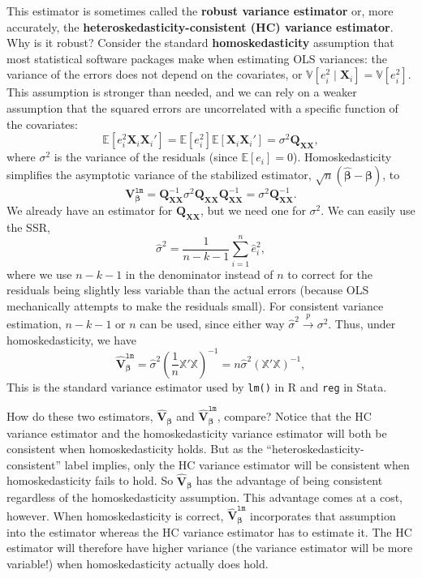 \documentclass[
  13pt,
  letterpaper,
  DIV=11,
  numbers=noendperiod]{scrreprt}
\newcommand{\mb}{\bm}
\newcommand{\E}{\mathbb{E}}
\newcommand{\V}{\mathbb{V}}
\newcommand{\X}{\mb{X}}
\newcommand{\Xmat}{\mathbb{X}}
\newcommand{\bfbeta}{\mb{\beta}}
\newcommand{\bhat}{\widehat{\mb{\beta}}}
\newcommand{\inprob}{\overset{p}{\to}}
\theoremstyle{plain}
\theoremstyle{plain}
\theoremstyle{definition}
\theoremstyle{definition}
\theoremstyle{remark}
\begin{document}
This estimator is sometimes called the \textbf{robust variance
estimator} or, more accurately, the
\textbf{heteroskedasticity-consistent (HC) variance estimator}. Why is
it robust? Consider the standard \textbf{homoskedasticity} assumption
that most statistical software packages make when estimating OLS
variances: the variance of the errors does not depend on the covariates,
or \(\V[e_{i}^{2} \mid \X_{i}] = \V[e_{i}^{2}]\). This assumption is
stronger than needed, and we can rely on a weaker assumption that the
squared errors are uncorrelated with a specific function of the
covariates: \[ 
\E[e_{i}^{2}\X_{i}\X_{i}'] = \E[e_{i}^{2}]\E[\X_{i}\X_{i}'] = \sigma^{2}\mb{Q}_{\X\X}, 
\] where \(\sigma^2\) is the variance of the residuals (since
\(\E[e_{i}] = 0\)). Homoskedasticity simplifies the asymptotic variance
of the stabilized estimator, \(\sqrt{n}(\bhat - \bfbeta)\), to \[ 
\mb{V}^{\texttt{lm}}_{\bfbeta} = \mb{Q}_{\X\X}^{-1}\sigma^{2}\mb{Q}_{\X\X}\mb{Q}_{\X\X}^{-1} = \sigma^2\mb{Q}_{\X\X}^{-1}.
\] We already have an estimator for \(\mb{Q}_{\X\X}\), but we need one
for \(\sigma^2\). We can easily use the SSR, \[ 
\widehat{\sigma}^{2} = \frac{1}{n-k-1} \sum_{i=1}^{n} \widehat{e}_{i}^{2},
\] where we use \(n-k-1\) in the denominator instead of \(n\) to correct
for the residuals being slightly less variable than the actual errors
(because OLS mechanically attempts to make the residuals small). For
consistent variance estimation, \(n-k -1\) or \(n\) can be used, since
either way \(\widehat{\sigma}^2 \inprob \sigma^2\). Thus, under
homoskedasticity, we have \[ 
\widehat{\mb{V}}_{\bfbeta}^{\texttt{lm}} = \widehat{\sigma}^{2}\left(\frac{1}{n}\Xmat'\Xmat\right)^{{-1}} = n\widehat{\sigma}^{2}\left(\Xmat'\Xmat\right)^{{-1}},
\] This is the standard variance estimator used by \texttt{lm()} in R
and \texttt{reg} in Stata.

How do these two estimators, \(\widehat{\mb{V}}_{\bfbeta}\) and
\(\widehat{\mb{V}}_{\bfbeta}^{\texttt{lm}}\), compare? Notice that the
HC variance estimator and the homoskedasticity variance estimator will
both be consistent when homoskedasticity holds. But as the
``heteroskedasticity-consistent'' label implies, only the HC variance
estimator will be consistent when homoskedasticity fails to hold. So
\(\widehat{\mb{V}}_{\bfbeta}\) has the advantage of being consistent
regardless of the homoskedasticity assumption. This advantage comes at a
cost, however. When homoskedasticity is correct,
\(\widehat{\mb{V}}_{\bfbeta}^{\texttt{lm}}\) incorporates that
assumption into the estimator whereas the HC variance estimator has to
estimate it. The HC estimator will therefore have higher variance (the
variance estimator will be more variable!) when homoskedasticity
actually does hold.
\end{document}

